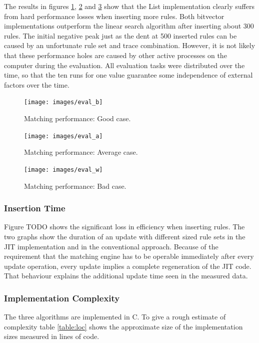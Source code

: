 \documentclass[a4paper,
		12pt,
		parskip=full,
		titlepage
		]{scrartcl}
\begin{document}
The results in figures \ref{fig:eval_good_case}, \ref{fig:eval_average_case} and \ref{fig:eval_bad_case} show that the List implementation
clearly suffers from hard performance losses when inserting more rules.
Both bitvector implementations outperform the linear search algorithm after inserting about 300 rules.
The initial negative peak just as the dent at 500 inserted rules can be caused by an unfortunate rule set and trace combination.
However, it is not likely that these performance holes are caused by other active processes on the computer during the evaluation.
All evaluation tasks were distributed over the time, so that the ten runs 
for one value guarantee some independence of external factors over the time.

\begin{figure}
\centering
\texttt{[image: images/eval\_b]}
\caption{Matching performance: Good case.}
\label{fig:eval_good_case}
\end{figure}

\begin{figure}
\centering
\texttt{[image: images/eval\_a]}
\caption{Matching performance: Average case.}
\label{fig:eval_average_case}
\end{figure}

\begin{figure}
\centering
\texttt{[image: images/eval\_w]}
\caption{Matching performance: Bad case.}
\label{fig:eval_bad_case}
\end{figure}

\subsubsection{Insertion Time}
Figure TODO shows the significant loss in efficiency when inserting rules. %
The two graphs show the duration of an update with different sized rule sets in the JIT implementation and in the conventional approach.
Because of the requirement that the matching engine has to be operable immediately after every update operation, every update implies a complete regeneration of the JIT code.
That behaviour explains the additional update time seen in the measured data. 

\subsubsection{Implementation Complexity}
The three algorithms are implemented in C.
To give a rough estimate of complexity table \ref{table:loc} shows the approximate size of the implementation sizes measured in lines of code.
\end{document}

